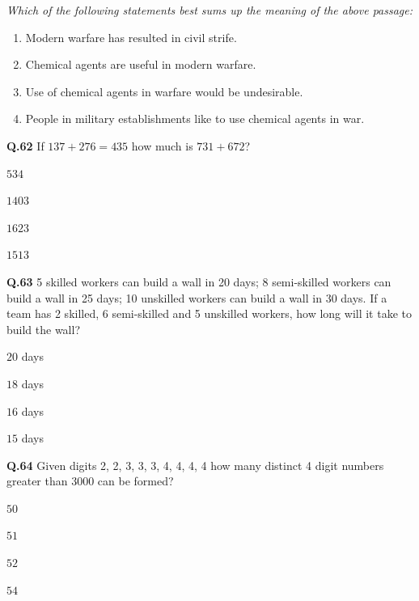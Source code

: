 \documentclass[journal,12pt,onecolumn]{IEEEtran}
\theoremstyle{remark}
\begin{document}
\begin{enumerate}
    \emph{Which of the following statements best sums up the meaning of the above passage:}
    \hfill{}
    \begin{enumerate}[label=(\Alph*)]
    \item Modern warfare has resulted in civil strife.
    \item Chemical agents are useful in modern warfare.
    \item Use of chemical agents in warfare would be undesirable.
    \item People in military establishments like to use chemical agents in war.
    \end{enumerate}
    \noindent\textbf{Q.62} If $137 + 276 = 435$ how much is $731 + 672$?
    \hfill{}
    \begin{enumerate}[label=(\Alph*)]
    \begin{multicols}{4}
    \item $534$
    \item $1403$
    \item $1623$
    \item $1513$
    \end{multicols}
    \end{enumerate}

    \noindent\textbf{Q.63} 5 skilled workers can build a wall in 20 days; 8 semi-skilled workers can build a wall in 25 days; 10 unskilled workers can build a wall in 30 days. If a team has 2 skilled, 6 semi-skilled and 5 unskilled workers, how long will it take to build the wall?
    \hfill{}
    \begin{enumerate}[label=(\Alph*)]
    \begin{multicols}{4}
    \item $20$ days
    \item $18$ days
    \item $16$ days
    \item $15$ days
    \end{multicols}
    \end{enumerate}

    \noindent\textbf{Q.64} Given digits 2, 2, 3, 3, 3, 4, 4, 4, 4 how many distinct 4 digit numbers greater than 3000 can be formed?
    \hfill{}
    \begin{enumerate}[label=(\Alph*)]
    \begin{multicols}{4}
    \item $50$
    \item $51$
    \item $52$
    \item $54$
    \end{multicols}
    \end{enumerate}


\end{enumerate}
\end{document}
